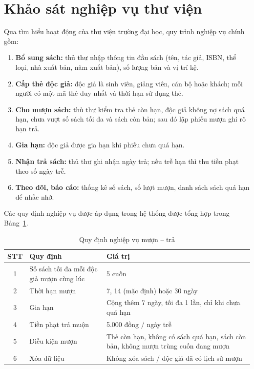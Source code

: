 \documentclass[../main.tex]{subfiles}
\begin{document}
\section{Khảo sát nghiệp vụ thư viện}
Qua tìm hiểu hoạt động của thư viện trường đại học, quy trình nghiệp vụ chính gồm:
\begin{enumerate}
    \item \textbf{Bổ sung sách:} thủ thư nhập thông tin đầu sách (tên, tác giả, ISBN, thể loại, nhà xuất bản, năm xuất bản), số lượng bản và vị trí kệ.
    \item \textbf{Cấp thẻ độc giả:} độc giả là sinh viên, giảng viên, cán bộ hoặc khách; mỗi người có một mã thẻ duy nhất và thời hạn sử dụng thẻ.
    \item \textbf{Cho mượn sách:} thủ thư kiểm tra thẻ còn hạn, độc giả không nợ sách quá hạn, chưa vượt số sách tối đa và sách còn bản; sau đó lập phiếu mượn ghi rõ hạn trả.
    \item \textbf{Gia hạn:} độc giả được gia hạn khi phiếu chưa quá hạn.
    \item \textbf{Nhận trả sách:} thủ thư ghi nhận ngày trả; nếu trễ hạn thì thu tiền phạt theo số ngày trễ.
    \item \textbf{Theo dõi, báo cáo:} thống kê số sách, số lượt mượn, danh sách sách quá hạn để nhắc nhở.
\end{enumerate}

Các quy định nghiệp vụ được áp dụng trong hệ thống được tổng hợp trong Bảng~\ref{tab:quy-dinh}.

\begin{table}[H]
\centering
\caption{Quy định nghiệp vụ mượn -- trả}
\label{tab:quy-dinh}
\begin{tabular}{|c|p{6cm}|p{6.5cm}|}
\hline
\textbf{STT} & \textbf{Quy định} & \textbf{Giá trị} \\
\hline
1 & Số sách tối đa mỗi độc giả mượn cùng lúc & 5 cuốn \\ \hline
2 & Thời hạn mượn & 7, 14 (mặc định) hoặc 30 ngày \\ \hline
3 & Gia hạn & Cộng thêm 7 ngày, tối đa 1 lần, chỉ khi chưa quá hạn \\ \hline
4 & Tiền phạt trả muộn & 5.000 đồng / ngày trễ \\ \hline
5 & Điều kiện mượn & Thẻ còn hạn, không có sách quá hạn, sách còn bản, không mượn trùng cuốn đang mượn \\ \hline
6 & Xóa dữ liệu & Không xóa sách / độc giả đã có lịch sử mượn \\ \hline
\end{tabular}
\end{table}
\end{document}
